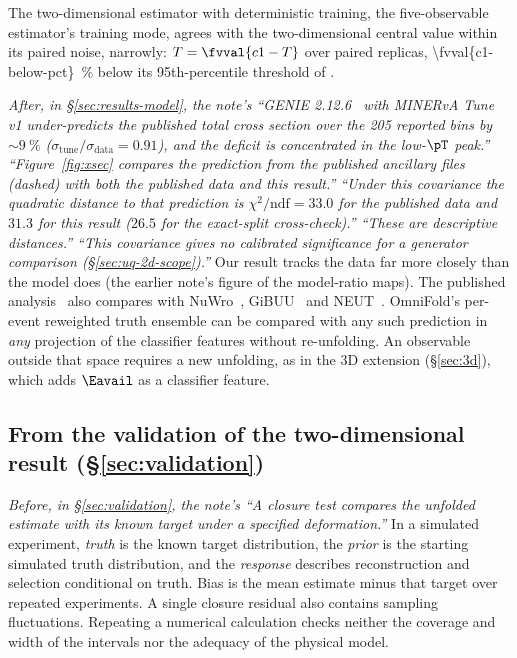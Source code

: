 The two-dimensional estimator with deterministic training, the five-observable estimator's training mode, agrees with the two-dimensional central value within its paired noise, narrowly: $T=\fvval{c1-T}$ over  paired replicas, \SI{\fvval{c1-below-pct}}{\percent} below its 95th-percentile threshold of .

\emph{After, in \S\ref{sec:results-model}, the note's ``GENIE 2.12.6~\cite{Andreopoulos:2009rq} with MINERvA Tune v1 under-predicts the published total cross section over the 205 reported bins by $\sim\SI{9}{\percent}$ ($\sigma_{\mathrm{tune}}/\sigma_{\mathrm{data}}=0.91$), and the deficit is concentrated in the low-$\pT$ peak.'' ``Figure~\ref{fig:xsec} compares the prediction from the published ancillary files (dashed) with both the published data and this result.'' ``Under this covariance the quadratic distance to that prediction is $\chi^{2}/\mathrm{ndf}=33.0$ for the published data and $31.3$ for this result ($26.5$ for the exact-split cross-check).'' ``These are descriptive distances.'' ``This covariance gives no calibrated significance for a generator comparison (\S\ref{sec:uq-2d-scope}).''}
Our result tracks the data far more closely than the model does (the earlier note's figure of the model-ratio maps). The published analysis~\cite{MINERvA:2021owq} also compares with NuWro~\cite{Golan:2012wx}, GiBUU~\cite{Buss:2011mx} and NEUT~\cite{Hayato:2009zz}. OmniFold's per-event reweighted truth ensemble can be compared with any such prediction in \emph{any} projection of the classifier features without re-unfolding. An observable outside that space requires a new unfolding, as in the 3D extension (\S\ref{sec:3d}), which adds $\Eavail$ as a classifier feature.


\subsection{From the validation of the two-dimensional result (\S\ref{sec:validation})}
\emph{Before, in \S\ref{sec:validation}, the note's ``A closure test compares the unfolded estimate with its known target under a specified deformation.''}
In a simulated experiment, \emph{truth} is the known target distribution, the \emph{prior} is the starting simulated truth distribution, and the \emph{response} describes reconstruction and selection conditional on truth. Bias is the mean estimate minus that target over repeated experiments. A single closure residual also contains sampling fluctuations. Repeating a numerical calculation checks neither the coverage and width of the intervals nor the adequacy of the physical model.

